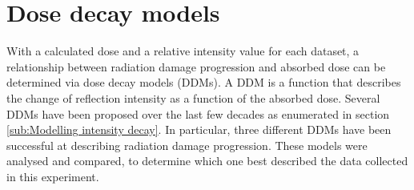 \section{Dose decay models}
\label{sec:Dose Decay Models}
With a calculated dose and a relative intensity value for each dataset, a relationship between radiation damage progression and absorbed dose can be determined via dose decay models (DDMs).
A DDM is a function that describes the change of reflection intensity as a function of the absorbed dose.
Several DDMs have been proposed over the last few decades as enumerated in section \ref{sub:Modelling intensity decay}.
In particular, three different DDMs have been successful at describing radiation damage progression.
These models were analysed and compared, to determine which one best described the data collected in this experiment.

